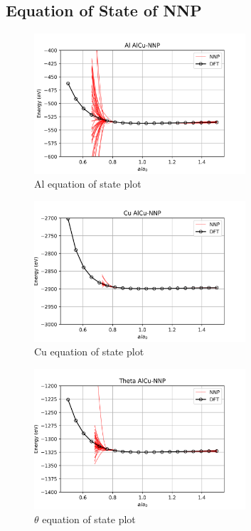 \documentclass{article}
\begin{document}
\subsection{Equation of State of NNP} \label{sct:eos_data}

\begin{figure}[H]%
\centering%
\includegraphics[width=0.7\textwidth,center]{figures/EOS_AlCu-NNP_Al.png}%
\caption{Al equation of state plot}%
\end{figure}

\begin{figure}[H]%
\centering%
\includegraphics[width=0.7\textwidth,center]{figures/EOS_AlCu-NNP_Cu.png}%
\caption{Cu equation of state plot}%
\end{figure}

\begin{figure}[H]%
\centering%
\includegraphics[width=0.7\textwidth,center]{figures/EOS_AlCu-NNP_Theta.png}%
\caption{$\theta$ equation of state plot}%
\end{figure}
\end{document}
